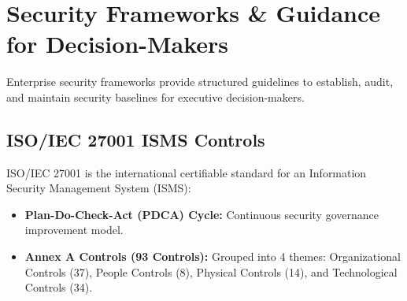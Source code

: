 \documentclass[12pt,a4paper]{article}
\begin{document}
\section{Security Frameworks \& Guidance for Decision-Makers}

Enterprise security frameworks provide structured guidelines to establish, audit, and maintain security baselines for executive decision-makers.

\begin{tcolorbox}[tikzbox, title={NIST Cybersecurity Framework (CSF) 5 Core Cycle}]
\centering
{}
\end{tcolorbox}

\subsection{ISO/IEC 27001 ISMS Controls}
ISO/IEC 27001 is the international certifiable standard for an Information Security Management System (ISMS):
\begin{itemize}[leftmargin=*, itemsep=3pt]
  \item \textbf{Plan-Do-Check-Act (PDCA) Cycle:} Continuous security governance improvement model.
  \item \textbf{Annex A Controls (93 Controls):} Grouped into 4 themes: Organizational Controls (37), People Controls (8), Physical Controls (14), and Technological Controls (34).
\end{itemize}
\end{document}
